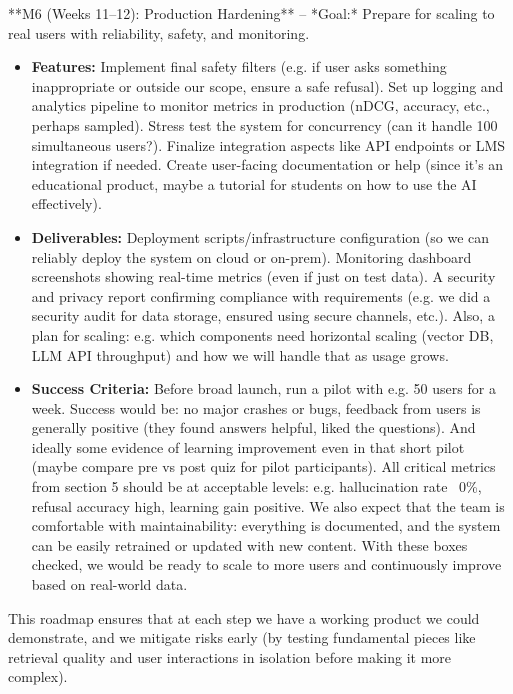 \documentclass[11pt]{article}
\begin{document}
**M6 (Weeks 11–12): Production Hardening** – *Goal:* Prepare for scaling to real users with reliability, safety, and monitoring.
  \begin{itemize}
    \item \textbf{Features:} Implement final safety filters (e.g. if user asks something inappropriate or outside our scope, ensure a safe refusal). Set up logging and analytics pipeline to monitor metrics in production (nDCG, accuracy, etc., perhaps sampled). Stress test the system for concurrency (can it handle 100 simultaneous users?). Finalize integration aspects like API endpoints or LMS integration if needed. Create user-facing documentation or help (since it’s an educational product, maybe a tutorial for students on how to use the AI effectively).
    \item \textbf{Deliverables:} Deployment scripts/infrastructure configuration (so we can reliably deploy the system on cloud or on-prem). Monitoring dashboard screenshots showing real-time metrics (even if just on test data). A security and privacy report confirming compliance with requirements (e.g. we did a security audit for data storage, ensured using secure channels, etc.). Also, a plan for scaling: e.g. which components need horizontal scaling (vector DB, LLM API throughput) and how we will handle that as usage grows.
    \item \textbf{Success Criteria:} Before broad launch, run a pilot with e.g. 50 users for a week. Success would be: no major crashes or bugs, feedback from users is generally positive (they found answers helpful, liked the questions). And ideally some evidence of learning improvement even in that short pilot (maybe compare pre vs post quiz for pilot participants). All critical metrics from section 5 should be at acceptable levels: e.g. hallucination rate ~0\%, refusal accuracy high, learning gain positive. We also expect that the team is comfortable with maintainability: everything is documented, and the system can be easily retrained or updated with new content. With these boxes checked, we would be ready to scale to more users and continuously improve based on real-world data.
  \end{itemize}

This roadmap ensures that at each step we have a working product we could demonstrate, and we mitigate risks early (by testing fundamental pieces like retrieval quality and user interactions in isolation before making it more complex).
\end{document}
